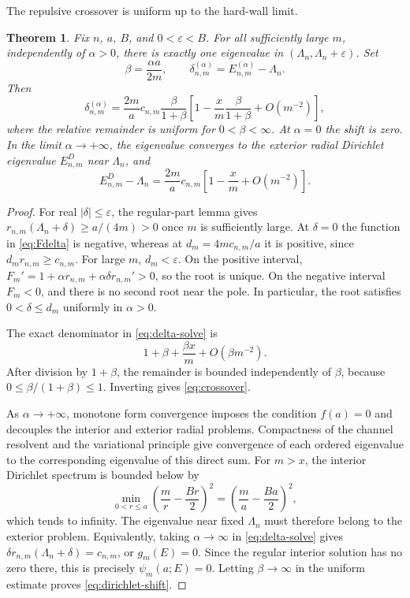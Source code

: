 \documentclass[12pt,a4paper]{article}
\numberwithin{equation}{section}
\newtheorem{thm}{Theorem}[section]
\theoremstyle{remark}
\theoremstyle{definition}
\begin{document}
The repulsive crossover is uniform up to the hard-wall limit.

\begin{thm}\label{thm:crossover}
Fix $n$, $a$, $B$, and $0<\varepsilon<B$. For all sufficiently large $m$,
independently of $\alpha>0$, there is exactly one eigenvalue in
$(\Lambda_n,\Lambda_n+\varepsilon)$. Set
$$
\beta=\frac{\alpha a}{2m},\qquad
\delta_{n,m}^{(\alpha)}=E_{n,m}^{(\alpha)}-\Lambda_n.
$$
Then
\begin{equation}\label{eq:crossover}
\delta_{n,m}^{(\alpha)}
=\frac{2m}{a}c_{n,m}\frac{\beta}{1+\beta}
\left[1-\frac{x}{m}\frac{\beta}{1+\beta}+O(m^{-2})\right],
\end{equation}
where the relative remainder is uniform for $0<\beta<\infty$.
At $\alpha=0$ the shift is zero. In the limit $\alpha\to+\infty$,
the eigenvalue converges to the exterior radial Dirichlet eigenvalue
$E_{n,m}^{D}$ near $\Lambda_n$, and
\begin{equation}\label{eq:dirichlet-shift}
E_{n,m}^{D}-\Lambda_n
=\frac{2m}{a}c_{n,m}\left[1-\frac{x}{m}+O(m^{-2})\right].
\end{equation}
\end{thm}

\begin{proof}
For real $|\delta|\le\varepsilon$, the regular-part lemma gives
$r_{n,m}(\Lambda_n+\delta)\ge a/(4m)>0$ once $m$ is sufficiently large.
At $\delta=0$ the function in \eqref{eq:Fdelta} is negative, whereas at
$d_m=4mc_{n,m}/a$ it is positive, since $d_m r_{n,m}\ge c_{n,m}$.
For large $m$, $d_m<\varepsilon$. On the positive interval,
$F_m'=1+\alpha r_{n,m}+\alpha\delta r_{n,m}'>0$, so the root is unique.
On the negative interval $F_m<0$, and there is no second root near the pole.
In particular, the root satisfies $0<\delta\le d_m$ uniformly in
$\alpha>0$.

The exact denominator in \eqref{eq:delta-solve} is
$$
1+\beta+\frac{\beta x}{m}+O(\beta m^{-2}).
$$
After division by $1+\beta$, the remainder is bounded independently of
$\beta$, because $0\le\beta/(1+\beta)\le1$. Inverting gives
\eqref{eq:crossover}.

As $\alpha\to+\infty$, monotone form convergence imposes the condition
$f(a)=0$ and decouples the interior and exterior radial problems.
Compactness of the channel resolvent and the variational principle give
convergence of each ordered eigenvalue to the corresponding eigenvalue
of this direct sum. For $m>x$, the interior Dirichlet spectrum is bounded
below by
$$
\min_{0<r\le a}\left(\frac{m}{r}-\frac{Br}{2}\right)^2
=\left(\frac{m}{a}-\frac{Ba}{2}\right)^2,
$$
which tends to infinity. The eigenvalue near fixed $\Lambda_n$ must
therefore belong to the exterior problem. Equivalently, taking
$\alpha\to\infty$ in \eqref{eq:delta-solve} gives
$\delta r_{n,m}(\Lambda_n+\delta)=c_{n,m}$, or $g_m(E)=0$.
Since the regular interior solution has no zero there, this is precisely
$\psi_m(a;E)=0$. Letting $\beta\to\infty$ in the uniform estimate proves
\eqref{eq:dirichlet-shift}.
\end{proof}
\end{document}

